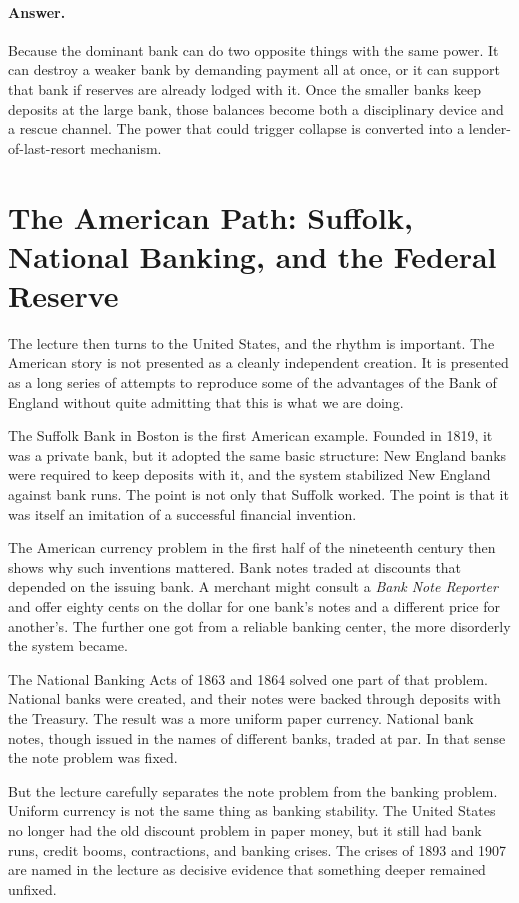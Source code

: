 \paragraph{Answer.} Because the dominant bank can do two opposite things with the same power. It can destroy a weaker bank by demanding payment all at once, or it can support that bank if reserves are already lodged with it. Once the smaller banks keep deposits at the large bank, those balances become both a disciplinary device and a rescue channel. The power that could trigger collapse is converted into a lender-of-last-resort mechanism.

\section{The American Path: Suffolk, National Banking, and the Federal Reserve}

The lecture then turns to the United States, and the rhythm is important. The American story is not presented as a cleanly independent creation. It is presented as a long series of attempts to reproduce some of the advantages of the Bank of England without quite admitting that this is what we are doing.

The Suffolk Bank in Boston is the first American example. Founded in 1819, it was a private bank, but it adopted the same basic structure: New England banks were required to keep deposits with it, and the system stabilized New England against bank runs. The point is not only that Suffolk worked. The point is that it was itself an imitation of a successful financial invention.

The American currency problem in the first half of the nineteenth century then shows why such inventions mattered. Bank notes traded at discounts that depended on the issuing bank. A merchant might consult a \emph{Bank Note Reporter} and offer eighty cents on the dollar for one bank's notes and a different price for another's. The further one got from a reliable banking center, the more disorderly the system became.

The National Banking Acts of 1863 and 1864 solved one part of that problem. National banks were created, and their notes were backed through deposits with the Treasury. The result was a more uniform paper currency. National bank notes, though issued in the names of different banks, traded at par. In that sense the note problem was fixed.

But the lecture carefully separates the note problem from the banking problem. Uniform currency is not the same thing as banking stability. The United States no longer had the old discount problem in paper money, but it still had bank runs, credit booms, contractions, and banking crises. The crises of 1893 and 1907 are named in the lecture as decisive evidence that something deeper remained unfixed.

